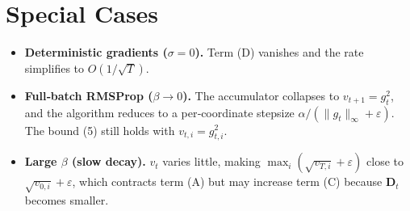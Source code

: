 \documentclass{article}
\begin{document}
\section*{Special Cases}
\begin{itemize}[leftmargin=*]
\item \textbf{Deterministic gradients ($\sigma=0$).} Term (D) vanishes and the rate simplifies to $O(1/\sqrt{T})$.
\item \textbf{Full‑batch RMSProp ($\beta\to0$).} The accumulator collapses to $v_{t+1}=g_{t}^{2}$, and the algorithm reduces to a per‑coordinate stepsize $\alpha/(\|g_{t}\|_{\infty}+\varepsilon)$. The bound (5) still holds with $v_{t,i}=g_{t,i}^{2}$.
\item \textbf{Large $\beta$ (slow decay).} $v_{t}$ varies little, making $\max_{i}(\sqrt{v_{T,i}}+\varepsilon)$ close to $\sqrt{v_{0,i}}+\varepsilon$, which contracts term (A) but may increase term (C) because $\mathbf D_{t}$ becomes smaller.
\end{itemize}
\end{document}
